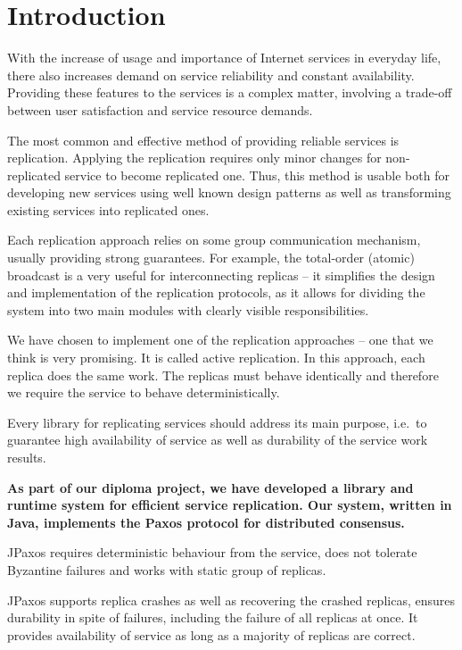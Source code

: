 \chapter{Introduction}

With the increase of usage and importance of Internet services in everyday life, there also increases demand on service reliability and constant availability.
Providing these features to the services is a complex matter, involving a trade-off between user satisfaction and service resource demands.

The most common and effective method of providing reliable services is replication. Applying the replication requires only minor changes for non-replicated service to become replicated one. Thus, this method is usable both for developing new services using well known design patterns as well as transforming existing services into replicated ones.

Each replication approach relies on some group communication mechanism, usually providing strong guarantees. For example, the total-order (atomic) broadcast is a very useful for interconnecting replicas -- it simplifies the design and implementation of the replication protocols, as it allows for dividing the system into two main modules with clearly visible responsibilities.

We have chosen to implement one of the replication approaches -- one that we think is very promising.
It is called active replication. In this approach, each replica does the same work. The replicas must behave identically and therefore we require the service to behave deterministically.

Every library for replicating services should address its main purpose, i.e.\ to guarantee high availability of service as well as durability of the service work results.


{\bfseries
As part of our diploma project, we have developed a library and runtime system for efficient service replication. Our system, written in Java, implements the Paxos protocol \cite{Lam98} for distributed consensus.

JPaxos requires deterministic behaviour from the service, does not tolerate Byzantine failures and works with static group of replicas.

JPaxos supports replica crashes as well as recovering the crashed replicas, \linebreak ensures durability in spite of failures, including the failure of all replicas at once. \linebreak It provides availability of service as long as a majority of replicas are correct.
}

